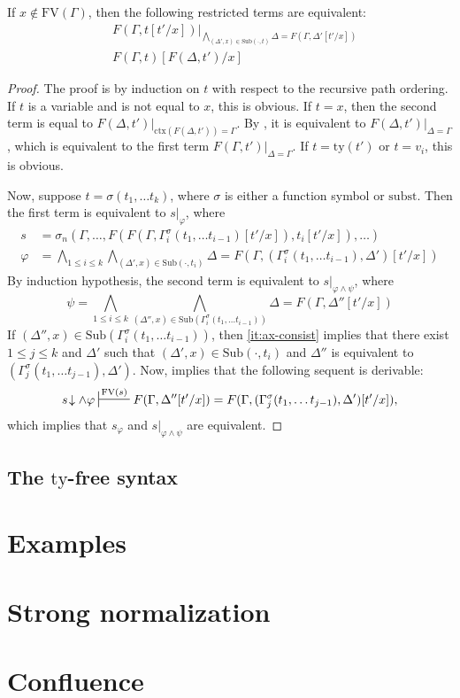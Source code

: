 \documentclass[reqno]{amsart}
\theoremstyle{definition}
\theoremstyle{remark}
\newcommand{\fs}[1]{\mathrm{#1}}
\newcommand{\FV}{\fs{FV}}
\newcommand{\subst}{\fs{subst}}
\newcommand{\ty}{\fs{ty}}
\newcommand{\ctx}{\fs{ctx}}
\newcommand{\sub}{\fs{Sub}}
\numberwithin{figure}{section}
\begin{document}
\begin{lem}
If $x \notin \FV(\Gamma)$, then the following restricted terms are equivalent:
\begin{align*}
& F(\Gamma, t[t'/x])|_{\bigwedge_{(\Delta',x) \in \sub(\cdot,t)} \Delta = F(\Gamma,\Delta'[t'/x])} \\
& F(\Gamma,t)[F(\Delta,t')/x]
\end{align*}
\end{lem}
\begin{proof}
The proof is by induction on $t$ with respect to the recursive path ordering.
If $t$ is a variable and is not equal to $x$, this is obvious.
If $t = x$, then the second term is equal to $F(\Delta,t')|_{\ctx(F(\Delta,t')) = \Gamma}$.
By , it is equivalent to $F(\Delta,t')|_{\Delta = \Gamma}$, which is equivalent to the first term $F(\Gamma,t')|_{\Delta = \Gamma}$.
If $t = \ty(t')$ or $t = v_i$, this is obvious.

Now, suppose $t = \sigma(t_1, \ldots t_k)$, where $\sigma$ is either a function symbol or $\subst$.
Then the first term is equivalent to $s|_\varphi$, where
\begin{align*}
s & = \sigma_n(\Gamma, \ldots, F(F(\Gamma, \Gamma^\sigma_i(t_1, \ldots t_{i-1})[t'/x]), t_i[t'/x]), \ldots) \\
\varphi & = \bigwedge_{1 \leq i \leq k} \bigwedge_{(\Delta',x) \in \sub(\cdot,t_i)} \Delta = F(\Gamma, (\Gamma^\sigma_i(t_1, \ldots t_{i-1}),\Delta')[t'/x])
\end{align*}
By induction hypothesis, the second term is equivalent to $s|_{\varphi \land \psi}$, where
\[ \psi = \bigwedge_{1 \leq i \leq k} \bigwedge_{(\Delta'',x) \in \sub(\Gamma^\sigma_i(t_1, \ldots t_{i-1}))} \Delta = F(\Gamma,\Delta''[t'/x]) \]
If $(\Delta'',x) \in \sub(\Gamma^\sigma_i(t_1, \ldots t_{i-1}))$, then \eqref{it:ax-consist} implies that there exist $1 \leq j \leq k$ and $\Delta'$ such that $(\Delta',x) \in \sub(\cdot,t_i)$ and $\Delta''$ is equivalent to $(\Gamma^\sigma_j(t_1, \ldots t_{j-1}), \Delta')$.
Now,  implies that the following sequent is derivable:
\[ s\!\downarrow \land \varphi \sststile{}{\FV(s)} F(\Gamma, \Delta''[t'/x]) = F(\Gamma, (\Gamma^\sigma_j(t_1, \ldots t_{j-1}), \Delta')[t'/x]), \]
which implies that $s_\varphi$ and $s|_{\varphi \land \psi}$ are equivalent.
\end{proof}

\subsection{The $\ty$-free syntax}
\label{sec:types}

\section{Examples}

\section{Strong normalization}

\section{Confluence}



\end{document}
